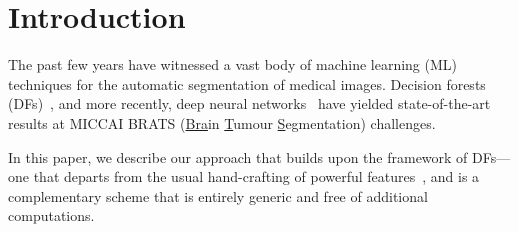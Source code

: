 
\section{Introduction}
\label{sec:intro}

The past few years have witnessed a vast body of machine learning (ML) techniques for 
the automatic segmentation of medical images. Decision forests (DFs)~\cite{zikic2012decision,tustison2013ants},
and more recently, deep neural networks~\cite{pereira2015deep} have yielded state-of-the-art results at 
MICCAI BRATS (\uline{Bra}in \uline{T}umour \uline{S}egmentation) challenges. 

In this paper, we describe our approach that builds upon the framework of DFs---one that departs from the usual 
hand-crafting of powerful features~\cite{cite-examples}, and is a complementary scheme that is entirely generic and 
free of additional computations.  
